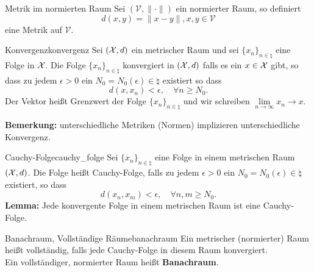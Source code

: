 \begin{recipe}{Metrik im normierten Raum}
  Sei $(\mathcal{V}, \|\cdot\|)$ ein normierter Raum, so definiert
  \begin{equation*}
    d(x,y) = \| x - y \|, x, y \in \mathcal{V}
  \end{equation*}
  eine Metrik auf $\mathcal{V}$.
\end{recipe}

\begin{boringDef}{Konvergenz}{konvergenz}
  Sei $(\mathcal{X}, d)$  ein metrischer Raum und sei $\{x_{n}\}_{n\in\natural}$ eine Folge in $\mathcal{X}$.
  Die Folge $\{x_{n}\}_{n\in\natural}$ konvergiert in $(\mathcal{X}, d)$ falls es ein $x \in \mathcal{X}$ gibt, so dass zu jedem $\epsilon > 0$ ein $N_{0} = N_{0}(\epsilon) \in \natural$ existiert so dass
  \begin{equation*}
    d(x, x_{n}) < \epsilon, \quad \forall n \geq N_{0}.
  \end{equation*}
  Der Vektor heißt Grenzwert der Folge $\{x_{n}\}_{n\in\natural}$ und wir schreiben $\lim\limits_{n\to\infty} x_{n} \to x$.

  \textbf{Bemerkung:} unterschiedliche Metriken (Normen) implizieren unterschiedliche Konvergenz.
\end{boringDef}

\begin{boringDef}{Cauchy-Folge}{cauchy_folge}
  Sei $\{x_{n}\}_{n\in\natural}$ eine Folge in einem metrischen Raum $(\mathcal{X}, d)$.
  Die Folge heißt Cauchy-Folge, falls zu jedem $\epsilon > 0$ ein $N_{0} = N_{0}(\epsilon) \in \natural$ existiert, so dass
  \begin{equation*}
    d(x_{n}, x_{m}) < \epsilon, \quad \forall n,m \geq N_{0}.
  \end{equation*}
  \textbf{Lemma:} Jede konvergente Folge in einem metrischen Raum ist eine Cauchy-Folge.
\end{boringDef}


\begin{boringDef}{Banachraum, Vollständige Räume}{banachraum}
  Ein metrischer (normierter) Raum heißt vollständig, falls jede Cauchy-Folge in diesem Raum konvergiert.\\
  Ein vollständiger, normierter Raum heißt \textbf{Banachraum}.
\end{boringDef}


